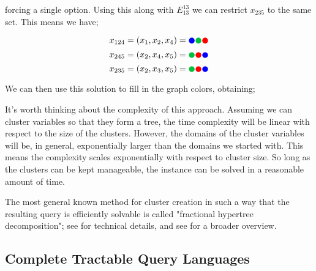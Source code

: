 forcing a single option. Using this along with $E^{13}_{13}$ we can restrict $x_{235}$ to the same set. This means we have;

\begin{equation}
    x_{124} = (x_1, x_2, x_4) = {\color{blue}\CIRCLE} {\color{darkgreen}\CIRCLE} {\color{red}\CIRCLE}
\end{equation}
\begin{equation}
    x_{245} = (x_2, x_4, x_5) = {\color{darkgreen}\CIRCLE} {\color{red}\CIRCLE} {\color{blue}\CIRCLE}
\end{equation}
\begin{equation}
    x_{235} = (x_2, x_3, x_5) = {\color{darkgreen}\CIRCLE} {\color{red}\CIRCLE} {\color{blue}\CIRCLE}
\end{equation}

We can then use this solution to fill in the graph colors, obtaining;

\begin{center}
\end{center}

It's worth thinking about the complexity of this approach. Assuming we can cluster variables so that they form a tree, the time complexity will be linear with respect to the size of the clusters. However, the domains of the cluster variables will be, in general, exponentially larger than the domains we started with. This means the complexity scales exponentially with respect to cluster size. So long as the clusters can be kept manageable, the instance can be solved in a reasonable amount of time.

The most general known method for cluster creation in such a way that the resulting query is efficiently solvable is called "fractional hypertree decomposition"; see \citep{grohe2014constraint} for technical details, and see \citep{marx2013tractable} for a broader overview.

\subsection{Complete Tractable Query Languages}\label{sec:complete-tractable-query-languages}


